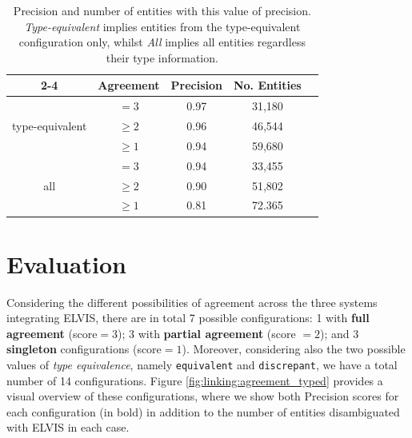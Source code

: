\begin{table}[ht!]
\centering
\def\arraystretch{1.2}
	\begin{tabular}{| c | c | c | c | c |}
\cline{2-4}
\multicolumn{1}{ c |  }{} & \textbf{Agreement} & \textbf{Precision} & \textbf{No. Entities} \\
\hline
\multirow{3}{*}{type-equivalent} & $=3$ & 0.97 & 31,180\\
&$\geq2$ & 0.96 & 46,544 \\
&$\geq1$ & 0.94 & 59,680 \\
\hline
\multirow{3}{*}{all} & $=3$ & 0.94 & 33,455\\
&$\geq2$ & 0.90 & 51,802\\
&$\geq1$ & 0.81 & 72.365\\
\hline
	\end{tabular}
	\caption[Precision and coverage]{Precision and number of entities with this value of precision. \textit{Type-equivalent} implies entities from the type-equivalent configuration only, whilst \textit{All} implies all entities regardless their type information.}
	\label{tbl:linking:results}
\end{table}

\section{Evaluation}
\label{sec:linking:eval}

Considering the different possibilities of agreement across the three systems integrating \textsc{ELVIS}, there are in total 7 possible configurations: 1 with \textbf{full agreement} (score$=3$); 3 with \textbf{partial agreement} (score $=2$); and 3 \textbf{singleton} configurations (score$=1$). Moreover, considering also the two possible values of \textit{type equivalence}, namely \texttt{equivalent} and \texttt{discrepant}, we have a total number of 14 configurations. Figure \ref{fig:linking:agreement_typed} provides a visual overview of these configurations, where we show both Precision scores for each configuration (in bold) in addition to the number of entities disambiguated with \textsc{ELVIS} in each case.


